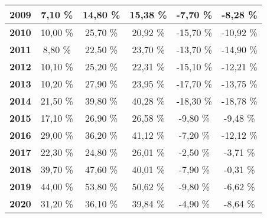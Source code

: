 \begin{center}
\begin{footnotesize}
\begin{longtable}{|c|c|c|c|c|c|}
\textbf{2009} & 7,10 \% & 14,80 \% & 15,38 \% & -7,70 \% & -8,28 \% \\ \hline
\textbf{2010} & 10,00 \% & 25,70 \% & 20,92 \% & -15,70 \% & -10,92 \% \\ \hline
\textbf{2011} & 8,80 \% & 22,50 \% & 23,70 \% & -13,70 \% & -14,90 \% \\ \hline
\textbf{2012} & 10,10 \% & 25,20 \% & 22,31 \% & -15,10 \% & -12,21 \% \\ \hline
\textbf{2013} & 10,20 \% & 27,90 \% & 23,95 \% & -17,70 \% & -13,75 \% \\ \hline
\textbf{2014} & 21,50 \% & 39,80 \% & 40,28 \% & -18,30 \% & -18,78 \% \\ \hline
\textbf{2015} & 17,10 \% & 26,90 \% & 26,58 \% & -9,80 \% & -9,48 \% \\ \hline
\textbf{2016} & 29,00 \% & 36,20 \% & 41,12 \% & -7,20 \% & -12,12 \% \\ \hline
\textbf{2017} & 22,30 \% & 24,80 \% & 26,01 \% & -2,50 \% & -3,71 \% \\ \hline
\textbf{2018} & 39,70 \% & 47,60 \% & 40,01 \% & -7,90 \% & -0,31 \% \\ \hline
\textbf{2019} & 44,00 \% & 53,80 \% & 50,62 \% & -9,80 \% & -6,62 \% \\ \hline
\textbf{2020} & 31,20 \% & 36,10 \% & 39,84 \% & -4,90 \% & -8,64 \% \\ \hline
\end{longtable} 
\end{footnotesize}
\end{center}
